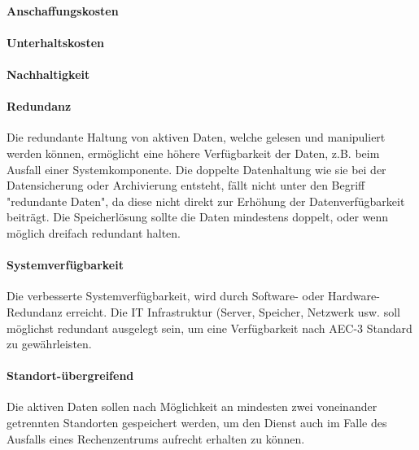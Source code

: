 \paragraph{Anschaffungskosten}\label{Soll-1-1}

\paragraph{Unterhaltskosten}\label{Soll-1-2}

\paragraph{Nachhaltigkeit}\label{Soll-1-3}


\renewcommand\theparagraph{Soll-2-\arabic{paragraph}}
\setcounter{paragraph}{0}

\paragraph{Redundanz}\label{Soll-2-1}
Die redundante Haltung von aktiven Daten, welche gelesen und manipuliert werden können, ermöglicht eine höhere Verfügbarkeit der Daten, z.B. beim Ausfall einer Systemkomponente. Die doppelte Datenhaltung wie sie bei der Datensicherung oder Archivierung entsteht, fällt nicht unter den Begriff "redundante Daten", da diese nicht direkt zur Erhöhung der Datenverfügbarkeit beiträgt. Die Speicherlösung sollte die Daten mindestens doppelt, oder wenn möglich dreifach redundant halten. 


\paragraph{Systemverfügbarkeit}\label{Soll-2-2}
Die verbesserte Systemverfügbarkeit, wird durch Software- oder Hardware-Redundanz erreicht. Die IT Infrastruktur (Server, Speicher, Netzwerk usw. soll möglichst redundant ausgelegt sein, um eine Verfügbarkeit nach AEC-3 Standard zu gewährleisten.

\paragraph{Standort-übergreifend}\label{Soll-2-3}
Die aktiven Daten sollen nach Möglichkeit an mindesten zwei voneinander getrennten Standorten gespeichert werden, um den Dienst auch im Falle des Ausfalls eines Rechenzentrums aufrecht erhalten zu können.


\renewcommand\theparagraph{Soll-3-\arabic{paragraph}}
\setcounter{paragraph}{0}

